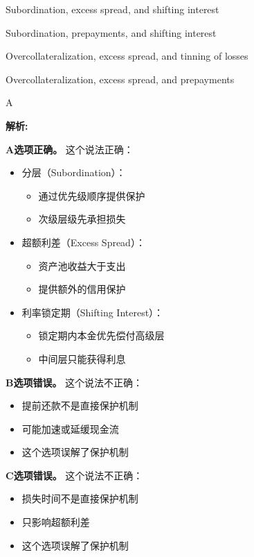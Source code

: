 \documentclass{article}
\newenvironment{explanation}
{\textbf{解析:}\par}
{\par}
\begin{document}
\begin{choices}
    \item Subordination, excess spread, and shifting interest
    \item Subordination, prepayments, and shifting interest
    \item Overcollateralization, excess spread, and tinning of losses
    \item Overcollateralization, excess spread, and prepayments
\end{choices}

\begin{correctanswer}
    A
\end{correctanswer}

\begin{explanation}
    \textbf{A选项正确。}
    这个说法正确：
    \begin{itemize}
        \item 分层（Subordination）：
        \begin{itemize}
            \item 通过优先级顺序提供保护
            \item 次级层级先承担损失
        \end{itemize}
        \item 超额利差（Excess Spread）：
        \begin{itemize}
            \item 资产池收益大于支出
            \item 提供额外的信用保护
        \end{itemize}
        \item 利率锁定期（Shifting Interest）：
        \begin{itemize}
            \item 锁定期内本金优先偿付高级层
            \item 中间层只能获得利息
        \end{itemize}
    \end{itemize}

    \textbf{B选项错误。}
    这个说法不正确：
    \begin{itemize}
        \item 提前还款不是直接保护机制
        \item 可能加速或延缓现金流
        \item 这个选项误解了保护机制
    \end{itemize}

    \textbf{C选项错误。}
    这个说法不正确：
    \begin{itemize}
        \item 损失时间不是直接保护机制
        \item 只影响超额利差
        \item 这个选项误解了保护机制
    \end{itemize}


\end{explanation}
\end{document}
